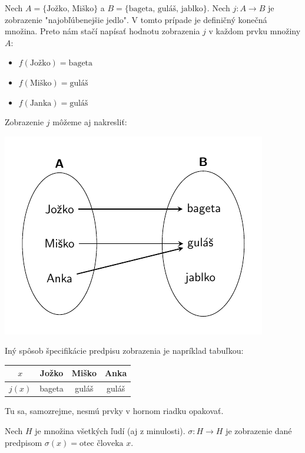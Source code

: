 \begin{example}\label{ex:jedlo}
Nech $A = \{\text{Jožko, Miško}\}$ a $B = \{\text{bageta, guláš, jablko}\}$.
Nech $j \colon A \rightarrow B$ je zobrazenie "najobľúbenejšie jedlo".
V tomto prípade je definičný konečná množina.
Preto nám stačí napísať hodnotu
zobrazenia $j$ v každom prvku množiny $A$:
\begin{itemize}
    \item $f(\text{Jožko}) = \text{bageta}$
    \item $f(\text{Miško}) = \text{guláš}$
    \item $f(\text{Janka}) = \text{guláš}$
\end{itemize}

Zobrazenie $j$ môžeme aj nakresliť:
\begin{center}
\includegraphics{figures/predn2_fig1.pdf}
\end{center}
\end{example}

Iný spôsob špecifikácie predpisu zobrazenia je napríklad tabuľkou:
\begin{center}
\begin{tabular}{c|ccc}
    $x$ & Jožko & Miško & Anka \\
    \hline
    $j(x)$ & bageta & guláš & guláš
\end{tabular}
\end{center}
Tu sa, samozrejme, nesmú prvky v hornom riadku opakovať.
\begin{example}
Nech $H$ je množina všetkých ľudí (aj z minulosti).
$\sigma \colon H \rightarrow H$ je zobrazenie dané predpisom $\sigma(x) = \text{otec človeka } x$.
\end{example}

